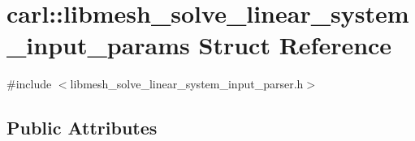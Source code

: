 \hypertarget{structcarl_1_1libmesh__solve__linear__system__input__params}{}\section{carl\+:\+:libmesh\+\_\+solve\+\_\+linear\+\_\+system\+\_\+input\+\_\+params Struct Reference}
\label{structcarl_1_1libmesh__solve__linear__system__input__params}


{\ttfamily \#include $<$libmesh\+\_\+solve\+\_\+linear\+\_\+system\+\_\+input\+\_\+parser.\+h$>$}

\subsection*{Public Attributes}
